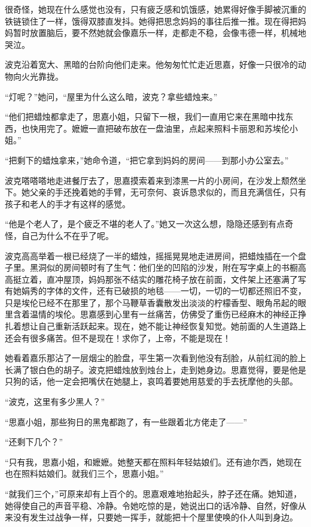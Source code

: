 \par 很奇怪，她现在什么感觉也没有，只有疲乏感和饥饿感，她累得好像手脚被沉重的铁链锁住了一样，饿得双膝直发抖。她得把思念妈妈的事往后推一推。现在得把妈妈暂时放置脑后，要不然她就会像嘉乐一样，走都走不稳，会像韦德一样，机械地哭泣。
\par 波克沿着宽大、黑暗的台阶向他们走来。他匆匆忙忙走近思嘉，好像一只很冷的动物向火光靠拢。
\par “灯呢？”她问，“屋里为什么这么暗，波克？拿些蜡烛来。”
\par “他们把蜡烛都拿走了，思嘉小姐，只留下一根，我们一直用它来在黑暗中找东西，也快用完了。嬷嬷一直把破布放在一盘油里，点起来照料卡丽恩和苏埃伦小姐。”
\par “把剩下的蜡烛拿来，”她命令道，“把它拿到妈妈的房间——到那小办公室去。”
\par 波克嗒嗒嗒地走进餐厅去了，思嘉摸索着来到漆黑一片的小房间，在沙发上颓然坐下。她父亲的手还挽着她的手臂，无可奈何、哀诉恳求似的，而且充满信任，只有孩子和老人的手才有这样的感觉。
\par “他是个老人了，是个疲乏不堪的老人了。”她又一次这么想，隐隐还感到有点奇怪，自己为什么不在乎了呢。
\par 波克高高举着一根已经烧了一半的蜡烛，摇摇晃晃地走进房间，把蜡烛插在一个盘子里。黑洞似的房间顿时有了生气：他们坐的凹陷的沙发，附在写字桌上的书橱高高挺立着，直冲屋顶，妈妈那张不结实的雕花椅子放在前面，文件架上还塞满了写有她娟秀的字体的文件，还有已破损的地毯——一切，一切的一切都还照旧不变，只是埃伦已经不在那里了，那个马鞭草香囊散发出淡淡的柠檬香型、眼角吊起的眼里含着温情的埃伦。思嘉感到心里有一丝痛苦，仿佛受了重伤已经麻木的神经正挣扎着想让自己重新活跃起来。现在，她不能让神经恢复知觉。她前面的人生道路上还会有很多痛苦。但不是现在！求你了，上帝，不能是现在！
\par 她看着嘉乐那沾了一层烟尘的脸盘，平生第一次看到他没有刮脸，从前红润的脸上长满了银白色的胡子。波克把蜡烛放到烛台上，走到她身边。思嘉觉得，要是他是只狗的话，他一定会把嘴伏在她腿上，哀鸣着要她用慈爱的手去抚摩他的头部。
\par “波克，这里有多少黑人？”
\par “思嘉小姐，那些狗日的黑鬼都跑了，有一些跟着北方佬走了——”
\par “还剩下几个？”
\par “只有我，思嘉小姐，和嬷嬷。她整天都在照料年轻姑娘们。还有迪尔西，她现在也在照料姑娘们。就我们三个，思嘉小姐。”
\par “就我们三个，”可原来却有上百个的。思嘉艰难地抬起头，脖子还在痛。她知道，她得使自己的声音平稳、冷静。令她吃惊的是，她说出口的话冷静、自然，好像从来没有发生过战争一样，只要她一挥手，就能把十个屋里使唤的仆人叫到身边。
